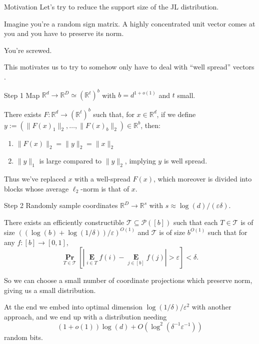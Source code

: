 \documentclass[10pt]{beamer}
\newcommand{\R}{\mathbb{R}}
\renewcommand{\P}{\operatorname*{\mathbf{Pr}}}
\newcommand{\E}{\operatorname*{\mathbf{E}}}
\newcommand{\eps}{\varepsilon}
\begin{document}
\begin{frame}
  \sectionpage
\end{frame}

\begin{frame}{Motivation}
  Let's try to reduce the support size of the JL distribution.

  \pause\bigskip\bigskip

  Imagine you're a random sign matrix. A highly concentrated unit
  vector comes at you and you have to preserve its norm.

  \pause\bigskip

  You're screwed.

  \pause\bigskip\bigskip

  This motivates us to try to somehow only have to deal with ``well
  spread'' vectors \cite{indyk2007uncertainty}.
\end{frame}

\begin{frame}{Step 1}
  Map $\R^d \to \R^D \simeq (\R^t)^b$ with $b = d^{1+o(1)}$ and $t$
  small.

  \begin{theorem}[informal]
    There exists $F : \R^d \to (\R^t)^b$ such that, for $x \in \R^d$,
    if we define $y := (\|F(x)_1\|_2,\ldots,\|F(x)_b\|_2) \in \R^b$,
    then:
    \begin{enumerate}
    \item $\|F(x)\|_2 = \|y\|_2 = \|x\|_2$
    \item $\|y\|_1$ is large compared to $\|y\|_2$, implying $y$ is
      well spread.
    \end{enumerate}
  \end{theorem}

  \pause\bigskip\bigskip
  Thus we've replaced $x$ with a well-spread $F(x)$, which moreover is
  divided into blocks whose average $\ell_2$-norm is that of $x$.
\end{frame}

\begin{frame}{Step 2}
  Randomly sample coordinates $\R^D \to \R^s$ with $s \approx
  \log(d)/(\eps \delta)$.

  \begin{theorem}
    There exists an efficiently constructible $\mathcal{T} \subseteq
    \mathcal{P}([b])$ such that each $T \in \mathcal{T}$ is of size
    $((\log(b)+\log(1/\delta))/\eps)^{O(1)}$ and $\mathcal{T}$ is
    of size $b^{O(1)}$ such that for any $f : [b] \to [0,1]$,
    \[
    \P_{T \in \mathcal{T}} [ |\E_{i \in T}f(i) - \E_{j \in
        [b]}f(j)| > \eps ] < \delta.
    \]
  \end{theorem}

  \pause\bigskip
  So we can choose a small number of coordinate projections which
  preserve norm, giving us a small distribution.

  \pause\bigskip
  At the end we embed into optimal dimension
  $\log(1/\delta)/\eps^2$ with another approach, and we end up
  with a distribution needing
  \[
  (1+o(1))\log(d) + O(\log^2(\delta^{-1}\eps^{-1}))
  \]
  random bits.
\end{frame}
\end{document}
